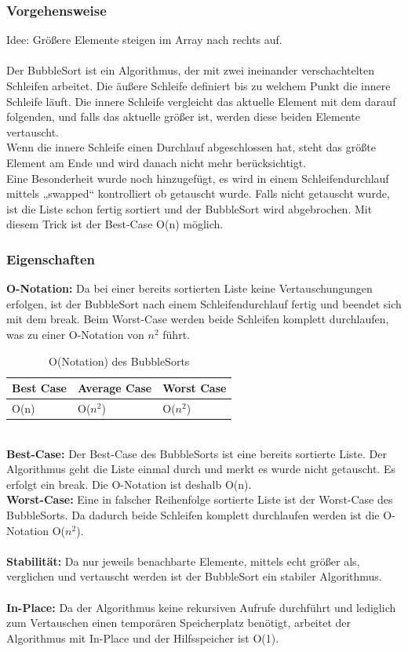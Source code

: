 \documentclass{article}
\begin{document}
\subsubsection{Vorgehensweise}
Idee: Größere Elemente steigen im Array nach rechts auf.\\ \\
Der BubbleSort ist ein Algorithmus, der mit zwei ineinander verschachtelten Schleifen arbeitet. Die äußere Schleife definiert bis zu welchem Punkt die innere Schleife läuft. Die innere Schleife vergleicht das aktuelle Element mit dem darauf folgenden, und falls das aktuelle größer ist, werden diese beiden Elemente vertauscht.\\
Wenn die innere Schleife einen Durchlauf abgeschlossen hat, steht das größte Element am Ende und wird danach nicht mehr berücksichtigt. \\
Eine Besonderheit wurde noch hinzugefügt, es wird in einem Schleifendurchlauf mittels „swapped“ kontrolliert ob getauscht wurde. Falls nicht getauscht wurde, ist die Liste schon fertig sortiert und der BubbleSort wird abgebrochen. Mit diesem Trick ist der Best-Case O(n) möglich. 


\subsubsection{Eigenschaften}
\textbf{O-Notation:} Da bei einer bereits sortierten Liste keine Vertauschungungen erfolgen, ist der BubbleSort nach einem Schleifendurchlauf fertig und beendet sich mit dem break. Beim Worst-Case werden beide Schleifen komplett durchlaufen, was zu einer O-Notation von $n^{2}$ führt.
\begin{table}[h]
\centering
\begin{tabular}{lll}
	\hline
	\textbf{Best Case} & \textbf{Average Case} & \textbf{Worst Case} \\
	\hline
	O(n) & O($n^{2}$) & O($n^{2}$) \\
	\hline
\end{tabular}
\caption{O(Notation) des BubbleSorts \cite{India2015Dataset}}
\label{tab:bubbleSort}
\end{table}
\\\textbf{Best-Case:} Der Best-Case des BubbleSorts ist eine bereits sortierte Liste. Der Algorithmus geht die Liste einmal durch und merkt es wurde nicht getauscht. Es erfolgt ein break. Die O-Notation ist deshalb O(n).\\
\textbf{Worst-Case:} Eine in falscher Reihenfolge sortierte Liste ist der Worst-Case des BubbleSorts. Da dadurch beide Schleifen komplett durchlaufen werden ist die O-Notation O($n^{2}$). \\ \\
\textbf{Stabilität:} Da nur jeweils benachbarte Elemente, mittels echt größer als, verglichen und vertauscht werden ist der BubbleSort ein stabiler Algorithmus. \\ \\
\textbf{In-Place:} Da der Algorithmus keine rekursiven Aufrufe durchführt und lediglich zum Vertauschen einen temporären Speicherplatz benötigt, arbeitet der Algorithmus mit In-Place und der Hilfsspeicher ist O(1). \cite{India2015Dataset}\\
\end{document}
